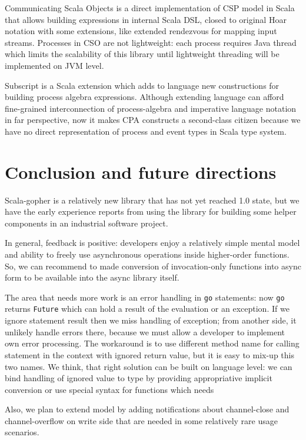 \documentclass[12pt]{article}
\begin{document}
 Communicating Scala Objects\cite{CSO} is a direct implementation of CSP model in Scala that allows
building expressions in internal Scala DSL, closed to original Hoar notation with some extensions, like extended rendezvous for mapping input streams.  Processes in CSO are not lightweight: each process requires Java thread which limits the scalability of this library until lightweight threading will be implemented on JVM level.

 Subscript\cite{vanDelft:2013:DCL:2489837.2489849} is a Scala extension which adds to language new constructions for building process algebra expressions. Although extending language can afford fine-grained interconnection of process-algebra and imperative language notation in far perspective, now it makes CPA constructs a second-class citizen because we have no direct representation of process and event types in Scala type system.

  
\section{ Conclusion and future directions }
  
  Scala-gopher is a relatively new library that has not yet reached 1.0 state, but we have the early experience
 reports from using the library for building some helper components in an industrial software project. 

 In general, feedback is positive: developers enjoy a relatively simple mental model and ability to freely use asynchronous operations inside higher-order functions.  So, we can recommend to made conversion of invocation-only functions into async form to be available into the async library itself. 

 The area that needs more work is an error handling in \verb|go| statements:  now \verb|go| returns 
\verb|Future| which can hold a result of the evaluation or an exception. If we ignore statement result then we miss handling of exception; from another side, it unlikely handle errors there, because we must allow a developer to implement own error processing. The workaround is to use different method name for calling statement in the context with ignored return value, but it is easy to mix-up this two names.
 We think, that right solution can be built on language level: we can bind handling of ignored value to type by providing appropriative implicit conversion or use special syntax for functions which needs 
 
 Also, we plan to extend model by adding notifications about channel-close and channel-overflow on write side that are needed in some relatively rare usage scenarios.
\end{document}
